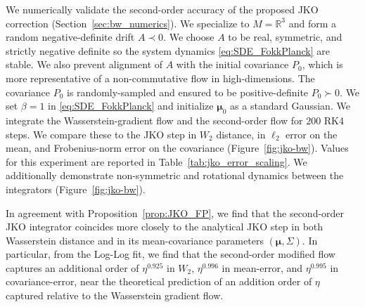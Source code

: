 \documentclass[reqno,11pt,letterpaper]{amsart}
\theoremstyle{plain}
\theoremstyle{definition}
\theoremstyle{remark}
\begin{document}
We numerically validate the second-order accuracy of the proposed JKO correction (Section~\ref{sec:bw_numerics}). We specialize to $M=\mathbb{R}^{3}$ and form a random negative-definite drift $A \prec 0$. We choose $A$ to be real, symmetric, and strictly negative definite so the system dynamics \eqref{eq:SDE_FokkPlanck} are stable. We also prevent alignment of $A$ with the initial covariance $P_{0}$, which is more representative of a non-commutative flow in high-dimensions. The covariance $P_{0}$ is randomly-sampled and ensured to be positive-definite $P_{0} \succ 0$. We set $\beta = 1$ in \eqref{eq:SDE_FokkPlanck} and initialize $\bm{\mu}_{0}$ as a standard Gaussian. We integrate the Wasserstein-gradient flow and the second-order flow for $200$ RK4 steps. We compare these to the JKO step in $W_2$ distance, in $\ell_{2}$ error on the mean, and Frobenius-norm error on the covariance (Figure~\ref{fig:jko-bw}). Values for this experiment are reported in Table~\ref{tab:jko_error_scaling}. We additionally demonstrate non-symmetric and rotational dynamics between the integrators (Figure~\ref{fig:jko-bw}).

In agreement with Proposition~\ref{prop:JKO_FP}, we find that the second-order JKO integrator coincides more closely to the analytical JKO step in both Wasserstein distance and in its mean-covariance parameters $(\bm{\mu}, \Sigma)$. In particular, from the Log-Log fit, we find that the second-order modified flow captures an additional order of $\eta^{0.925}$ in $W_2$, $\eta^{0.996}$ in mean-error, and $\eta^{0.995}$ in covariance-error, near the theoretical prediction of an addition order of $\eta$ captured relative to the Wasserstein gradient flow. 
\end{document}
